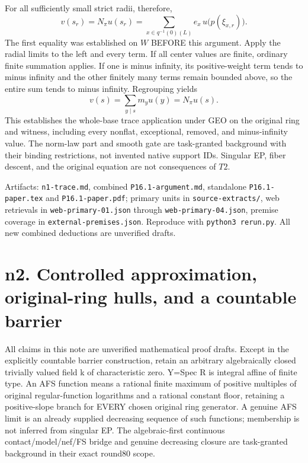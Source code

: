 \documentclass[
  10pt,
]{article}
\begin{document}
For all sufficiently small strict radii, therefore, \[
 v(s_r)=N_\pi u(s_r)
       =\sum_{x\in q^{-1}(0)(L)} e_x\,u\bigl(p(\xi_{x,r})\bigr).
\] The first equality was established on \(W\) BEFORE this argument.
Apply the radial limits to the left and every term. If all center values
are finite, ordinary finite summation applies. If one is minus infinity,
its positive-weight term tends to minus infinity and the other finitely
many terms remain bounded above, so the entire sum tends to minus
infinity. Regrouping yields \[
 v(s)=\sum_{y\mid s}m_y u(y)=N_\pi u(s).
\tag{T2}
\] This establishes the whole-base trace application under GEO on the
original ring and witness, including every nonflat, exceptional,
removed, and minus-infinity value. The norm-law part and smooth gate are
task-granted background with their binding restrictions, not invented
native support IDs. Singular EP, fiber descent, and the original
equation are not consequences of \(T2\).

Artifacts: \texttt{n1-trace.md}, combined \texttt{P16.1-argument.md},
standalone \texttt{P16.1-paper.tex} and \texttt{P16.1-paper.pdf};
primary units in \texttt{source-extracts/}, web retrievals in
\texttt{web-primary-01.json} through \texttt{web-primary-04.json},
premise coverage in \texttt{external-premises.json}. Reproduce with
\texttt{python3\ rerun.py}. All new combined deductions are unverified
drafts.

\section{n2. Controlled approximation, original-ring hulls, and a
countable
barrier}\label{n2.-controlled-approximation-original-ring-hulls-and-a-countable-barrier}

All claims in this note are unverified mathematical proof drafts. Except
in the explicitly countable barrier construction, retain an arbitrary
algebraically closed trivially valued field k of characteristic zero.
Y=Spec R is integral affine of finite type. An AFS function means a
rational finite maximum of positive multiples of original
regular-function logarithms and a rational constant floor, retaining a
positive-slope branch for EVERY chosen original ring generator. A
genuine AFS limit is an already supplied decreasing sequence of such
functions; membership is not inferred from singular EP. The
algebraic-first continuous contact/model/nef/FS bridge and genuine
decreasing closure are task-granted background in their exact round80
scope.
\end{document}
